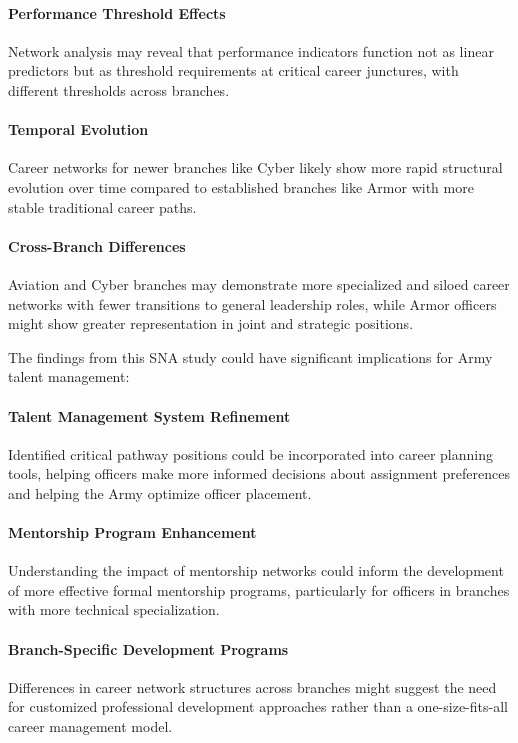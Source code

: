 \documentclass[../main.tex]{subfiles}
\begin{document}
\paragraph{Performance Threshold Effects} Network analysis may reveal that performance indicators function not as linear predictors but as threshold requirements at critical career junctures, with different thresholds across branches.

\paragraph{Temporal Evolution} Career networks for newer branches like Cyber likely show more rapid structural evolution over time compared to established branches like Armor with more stable traditional career paths.

\paragraph{Cross-Branch Differences} Aviation and Cyber branches may demonstrate more specialized and siloed career networks with fewer transitions to general leadership roles, while Armor officers might show greater representation in joint and strategic positions.


The findings from this SNA study could have significant implications for Army talent management:

\paragraph{Talent Management System Refinement} Identified critical pathway positions could be incorporated into career planning tools, helping officers make more informed decisions about assignment preferences and helping the Army optimize officer placement.

\paragraph{Mentorship Program Enhancement} Understanding the impact of mentorship networks could inform the development of more effective formal mentorship programs, particularly for officers in branches with more technical specialization.

\paragraph{Branch-Specific Development Programs} Differences in career network structures across branches might suggest the need for customized professional development approaches rather than a one-size-fits-all career management model.
\end{document}
